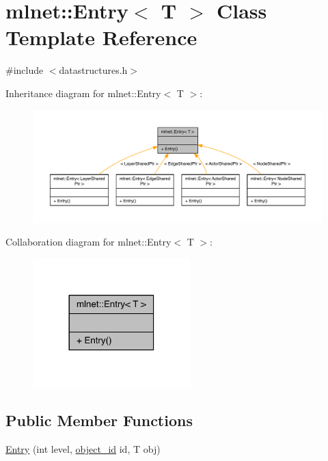\hypertarget{classmlnet_1_1_entry}{\section{mlnet\+:\+:Entry$<$ T $>$ Class Template Reference}
\label{classmlnet_1_1_entry}
}


{\ttfamily \#include $<$datastructures.\+h$>$}



Inheritance diagram for mlnet\+:\+:Entry$<$ T $>$\+:\nopagebreak
\begin{figure}[H]
\begin{center}
\leavevmode
\includegraphics[width=350pt]{classmlnet_1_1_entry__inherit__graph}
\end{center}
\end{figure}


Collaboration diagram for mlnet\+:\+:Entry$<$ T $>$\+:\nopagebreak
\begin{figure}[H]
\begin{center}
\leavevmode
\includegraphics[width=173pt]{classmlnet_1_1_entry__coll__graph}
\end{center}
\end{figure}
\subsection*{Public Member Functions}
\begin{DoxyCompactItemize}
\item 
\hyperlink{classmlnet_1_1_entry_a61aa2a28da149dd5ff9e5137560ba71f}{Entry} (int level, \hyperlink{namespacemlnet_a318fc9bfdb74e1da4d44d0c50d4a453d}{object\+\_\+id} id, T obj)
\end{DoxyCompactItemize}
